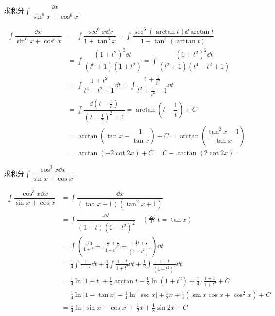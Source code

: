 \newpage
\begin{example}{}{}
    求积分$\displaystyle \int\dfrac{\dd x}{\sin^6x+\cos^6x}$
\end{example}
\begin{solution}
    \begin{align*}
    \int\dfrac{\dd x}{\sin^6x+\cos^6x}&=\int\dfrac{\sec^6x\dd x}{1+\tan^6x}=\int\dfrac{\sec^6(\arctan t)\dd\arctan t}{1+\tan^6(\arctan t)}\\
    &=\int\dfrac{(1+t^2)^3\dd t}{(t^6+1)(1+t^2)}=\int\dfrac{(1+t^2)^2\dd t}{(t^2+1)(t^4-t^2+1)}\\
    &=\int\dfrac{1+t^2}{t^4-t^2+1}\dd t=\int \dfrac{1+\frac{1}{t^2}}{t^2+\frac{1}{t^2}-1}\dd t\\
    &=\int\dfrac{\dd(t-\frac1{t})}{(t-\frac1{t})^2+1}=\arctan(t-\dfrac1{t})+C\\
    &=\arctan(\tan x-\dfrac{1}{\tan x})+C=\arctan(\dfrac{\tan^2x-1}{\tan x})\\
    &=\arctan(-2\cot 2x)+C=C-\arctan(2\cot 2x).
    \end{align*}
\end{solution}
\begin{example}{}{}
    求积分$\displaystyle \int\dfrac{\cos^3x\dd x}{\sin x+\cos x}$.
\end{example}
\begin{solution}
    \begin{align*}
        \int\dfrac{\cos^3x\dd x}{\sin x+\cos x} &= \int\dfrac{\dd x}{(\tan x+1)(\tan^2 x+1)} \\
        &= \int\dfrac{\dd t}{(1+t)(1+t^2)^2} \quad (\text{令 } t = \tan x) \\
        &= \int \left( \frac{1/4}{1+t} + \frac{-\frac{1}{4}t + \frac{1}{4}}{1+t^2} + \frac{-\frac{1}{2}t + \frac{1}{2}}{(1+t^2)^2} \right) \dd t \\
        &= \frac{1}{4} \int \frac{1}{1+t} \dd t + \frac{1}{4} \int \frac{1-t}{1+t^2} \dd t + \frac{1}{2} \int \frac{1-t}{(1+t^2)^2} \dd t \\
        &= \frac{1}{4} \ln |1+t| + \frac{1}{4} \arctan t - \frac{1}{8} \ln (1+t^2) + \frac{1}{4} \cdot \frac{t+1}{1+t^2} + C \\
        &= \frac{1}{4} \ln |1+\tan x| - \frac{1}{4} \ln |\sec x| + \frac{1}{2} x + \frac{1}{4} (\sin x \cos x + \cos^2 x) + C \\
        &= \frac{1}{4} \ln |\sin x + \cos x| + \frac{1}{2} x + \frac{1}{8} \sin 2x + C
    \end{align*}
\end{solution}
